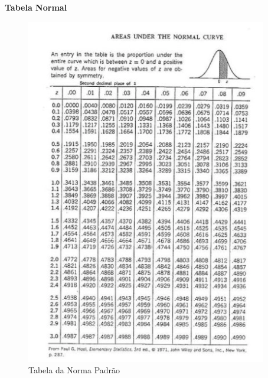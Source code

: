 \documentclass[
  letterpaper,
  DIV=11,
  numbers=noendperiod]{scrreprt}
\begin{document}
\begin{tcolorbox}[enhanced jigsaw, colframe=quarto-callout-note-color-frame, opacityback=0, breakable, leftrule=.75mm, toprule=.15mm, arc=.35mm, rightrule=.15mm, bottomrule=.15mm, left=2mm, colback=white]
\begin{minipage}[t]{5.5mm}
\textcolor{quarto-callout-note-color}{\faInfo}
\end{minipage}%
\begin{minipage}[t]{\textwidth - 5.5mm}

\vspace{-3mm}\textbf{Tabela Normal}\vspace{3mm}

\begin{figure}[H]

{\centering \includegraphics[width=0.8\linewidth,height=\textheight,keepaspectratio]{figuras/normal.png}

}

\caption{Tabela da Norma Padrão \label{normal_z}}

\end{figure}%

\end{minipage}%
\end{tcolorbox}
\end{document}
